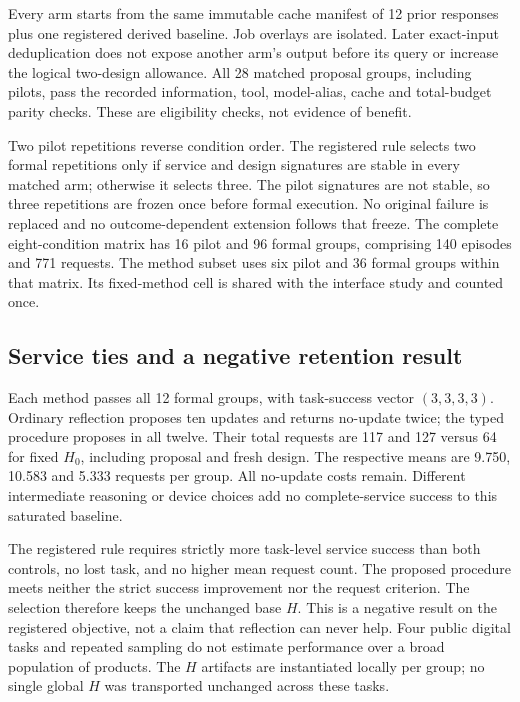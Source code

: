 Every arm starts from the same immutable cache manifest of 12 prior responses
plus one registered derived baseline. Job overlays are isolated. Later exact-input
deduplication does not expose another arm's output before its query or increase
the logical two-design allowance. All 28 matched proposal groups, including
pilots, pass the recorded information, tool, model-alias, cache and total-budget
parity checks. These are eligibility checks, not evidence of benefit.

Two pilot repetitions reverse condition order. The registered rule selects two
formal repetitions only if service and design signatures are stable in every
matched arm; otherwise it selects three. The pilot signatures are not stable,
so three repetitions are frozen once before formal execution. No original
failure is replaced and no outcome-dependent extension follows that freeze.
The complete eight-condition matrix has 16 pilot and 96 formal groups, comprising
140 episodes and 771 requests. The method subset uses six pilot and 36 formal
groups within that matrix. Its fixed-method cell is shared with the interface
study and counted once.

\subsection{Service ties and a negative retention result}

Each method passes all 12 formal groups, with task-success vector $(3,3,3,3)$.
Ordinary reflection proposes ten updates and returns no-update twice; the typed
procedure proposes in all twelve. Their total requests are 117 and 127 versus
64 for fixed $H_0$, including proposal and fresh design. The respective means
are 9.750, 10.583 and 5.333 requests per group. All no-update costs remain.
Different intermediate reasoning or device choices add no complete-service
success to this saturated baseline.

The registered rule requires strictly more task-level service success than
both controls, no lost task, and no higher mean request count. The proposed
procedure meets neither the strict success improvement nor the request criterion.
The selection therefore keeps the unchanged base $H$. This is a negative
result on the registered objective, not a claim that reflection can never help.
Four public digital tasks and repeated sampling do not estimate performance
over a broad population of products. The $H$ artifacts are instantiated locally
per group; no single global $H$ was transported unchanged across these tasks.

